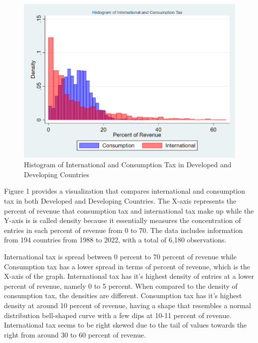 \documentclass[12pt]{article}
\begin{document}
\begin{figure}[H]
    \centering
    \includegraphics[width=0.8\linewidth]{Reproducibility_Package//research_outputs/twowayhistintcons.png}
    \caption{Histogram of International and Consumption Tax in Developed and Developing Countries}
    \label{fig:enter-label}
\end{figure}

Figure 1 provides a visualization that compares international and consumption tax in both Developed and Developing Countries. The X-axis represents the percent of revenue that consumption tax and international tax make up while the Y-axis is is called density because it essentially measures the concentration of entries in each percent of revenue from 0 to 70. The data includes information from 194 countries from 1988 to 2022, with a total of 6,180 observations. 

International tax is spread between 0 percent to 70 percent of revenue while Consumption tax has a lower spread in terms of percent of revenue, which is the X-axis of the graph. International tax has it’s highest density of entries at a lower percent of revenue, namely 0 to 5 percent. When compared to the density of consumption tax, the densities are different. Consumption tax has it’s highest density at around 10 percent of revenue, having a shape that resembles a normal distribution bell-shaped curve with a few dips at 10-11 percent of revenue. International tax seems to be right skewed due to the tail of values towards the right from around 30 to 60 percent of revenue. 
\end{document}

